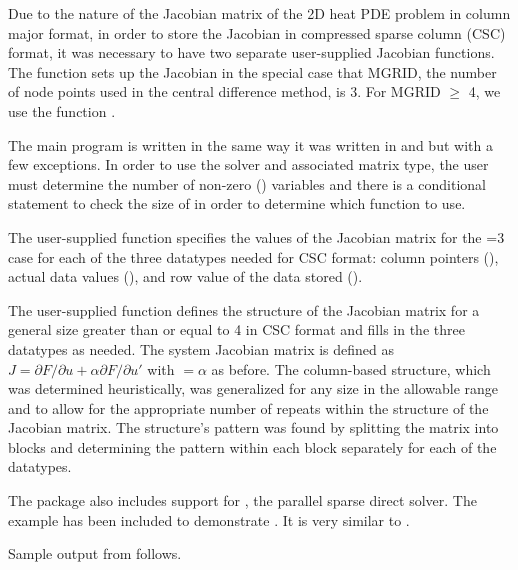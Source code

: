 Due to the nature of the Jacobian matrix of the 2D heat PDE problem in column
major format, in order to store the Jacobian in compressed sparse column (CSC)
format, it was necessary to have two separate user-supplied Jacobian functions.
The function  sets up the Jacobian in the special case that MGRID,
the number of node points used in the central difference method, is 3. For MGRID
$\geq$ 4, we use the function .

The main program is written in the same way it was written in
 and  but with a few exceptions. In order
to use the {\sunlinsolklu} solver and associated {\sunmatsparse}
matrix type, the user must determine the number of non-zero
() variables and there is a conditional statement to check the size of
 in order to determine which  function to use.

The user-supplied function  specifies the values of the Jacobian
matrix for the =3 case for each of the three datatypes needed for CSC
format: column pointers (), actual data values (), and row
value of the data stored (). 

The user-supplied function  defines the structure of the Jacobian
matrix for a general  size greater than or equal to 4 in CSC format
and fills in the three datatypes as needed. The system Jacobian matrix is
defined as $J = \partial F/ \partial u + \alpha \partial F/ \partial u'$ with
 $=\alpha$ as before. The column-based structure, which was determined
heuristically, was generalized for any size in the allowable range and to allow
for the appropriate number of repeats within the structure of the Jacobian
matrix. The structure's pattern was found by splitting the matrix into
 blocks and determining the pattern within each block separately for
each of the datatypes.

The {\ida} package also includes support for , the
parallel sparse direct solver. The  example has
been included to demonstrate . It is very similar to
.

Sample output from  follows.
